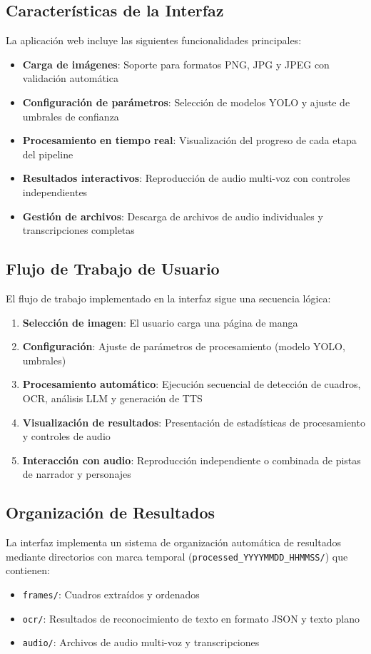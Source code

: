 \documentclass[conference]{IEEEtran}
\begin{document}
\subsection{Características de la Interfaz}
La aplicación web incluye las siguientes funcionalidades principales:
\begin{itemize}
\item \textbf{Carga de imágenes}: Soporte para formatos PNG, JPG y JPEG con validación automática
\item \textbf{Configuración de parámetros}: Selección de modelos YOLO y ajuste de umbrales de confianza
\item \textbf{Procesamiento en tiempo real}: Visualización del progreso de cada etapa del pipeline
\item \textbf{Resultados interactivos}: Reproducción de audio multi-voz con controles independientes
\item \textbf{Gestión de archivos}: Descarga de archivos de audio individuales y transcripciones completas
\end{itemize}

\subsection{Flujo de Trabajo de Usuario}
El flujo de trabajo implementado en la interfaz sigue una secuencia lógica:
\begin{enumerate}
\item \textbf{Selección de imagen}: El usuario carga una página de manga
\item \textbf{Configuración}: Ajuste de parámetros de procesamiento (modelo YOLO, umbrales)
\item \textbf{Procesamiento automático}: Ejecución secuencial de detección de cuadros, OCR, análisis LLM y generación de TTS
\item \textbf{Visualización de resultados}: Presentación de estadísticas de procesamiento y controles de audio
\item \textbf{Interacción con audio}: Reproducción independiente o combinada de pistas de narrador y personajes
\end{enumerate}

\subsection{Organización de Resultados}
La interfaz implementa un sistema de organización automática de resultados mediante directorios con marca temporal (\texttt{processed\_YYYYMMDD\_HHMMSS/}) que contienen:
\begin{itemize}
\item \texttt{frames/}: Cuadros extraídos y ordenados
\item \texttt{ocr/}: Resultados de reconocimiento de texto en formato JSON y texto plano
\item \texttt{audio/}: Archivos de audio multi-voz y transcripciones
\end{itemize}
\end{document}
